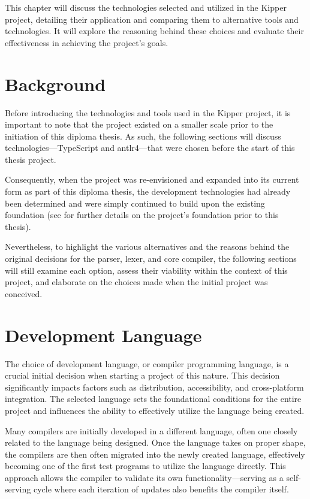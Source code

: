
This chapter will discuss the technologies selected and utilized in the Kipper project, detailing their application and comparing them to alternative tools and technologies. It will explore the reasoning behind these choices and evaluate their effectiveness in achieving the project's goals.

\section{Background}
\label{sec:technology-background}

Before introducing the technologies and tools used in the Kipper project, it is important to note that the project existed on a smaller scale prior to the initiation of this diploma thesis. As such, the following sections will discuss technologies—TypeScript and \Gls{antlr4}—that were chosen before the start of this thesis project. 

Consequently, when the project was re-envisioned and expanded into its current form as part of this diploma thesis, the development technologies had already been determined and were simply continued to build upon the existing foundation (see  for further details on the project's foundation prior to this thesis).

Nevertheless, to highlight the various alternatives and the reasons behind the original decisions for the parser, lexer, and core compiler, the following sections will still examine each option, assess their viability within the context of this project, and elaborate on the choices made when the initial project was conceived.

\section{Development Language}
\label{sec:development-language}

The choice of development language, or compiler programming language, is a crucial initial decision when starting a project of this nature. This decision significantly impacts factors such as distribution, accessibility, and cross-platform integration. The selected language sets the foundational conditions for the entire project and influences the ability to effectively utilize the language being created.

Many compilers are initially developed in a different language, often one closely related to the language being designed. Once the language takes on proper shape, the compilers are then often migrated into the newly created language, effectively becoming one of the first test programs to utilize the language directly. This approach allows the compiler to validate its own functionality—serving as a self-serving cycle where each iteration of updates also benefits the compiler itself.

